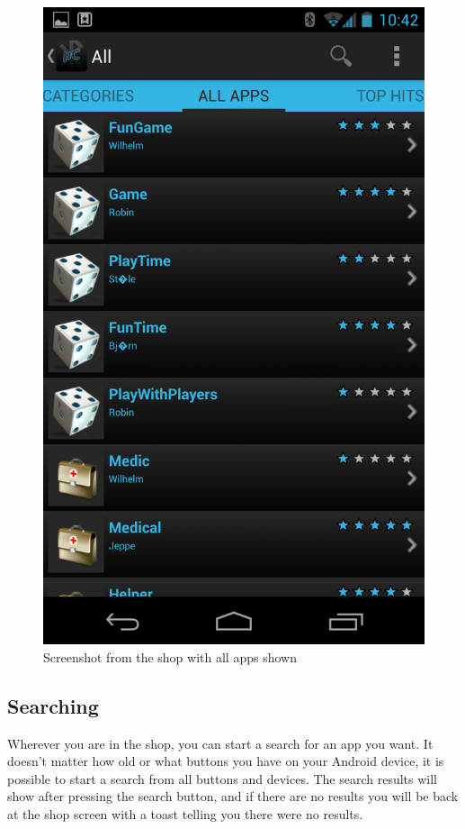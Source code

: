 		\newline
		\begin{figure}[H]
			\centering
			\includegraphics[scale = 0.3]{images/Screenshots/all_apps.png}
			\caption{Screenshot from the shop with all apps shown}
		\end{figure}

		\subsection{Searching}
			Wherever you are in the shop, you can start a search for an app you want. It doesn't matter how old or what buttons you have on your Android device, it is possible to start a search from all buttons and devices. The search results will show after pressing the search button, and if there are no results you will be back at the shop screen with a toast telling you there were no results.

